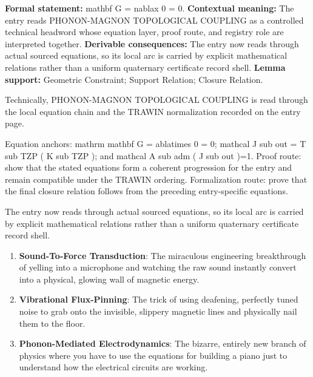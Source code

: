 \begingroup\footnotesize\setlength{\emergencystretch}{3em}\sloppy
\textbf{Formal statement:} mathbf G = nablax 0 = 0. \textbf{Contextual meaning:} The entry reads PHONON-MAGNON TOPOLOGICAL COUPLING as a controlled technical headword whose equation layer, proof route, and registry role are interpreted together. \textbf{Derivable consequences:} The entry now reads through actual sourced equations, so its local arc is carried by explicit mathematical relations rather than a uniform quaternary certificate record shell. \textbf{Lemma support:} Geometric Constraint; Support Relation; Closure Relation.\par
\endgroup

Technically, PHONON-MAGNON TOPOLOGICAL COUPLING is read through the local equation chain and the TRAWIN normalization recorded on the entry page.

Equation anchors: mathrm mathbf G = ablatimes 0 = 0; mathcal J sub out = T sub TZP ( K sub TZP ); and mathcal A sub adm ( J sub out )=1. Proof route: show that the stated equations form a coherent progression for the entry and remain compatible under the TRAWIN ordering. Formalization route: prove that the final closure relation follows from the preceding entry-specific equations.

The entry now reads through actual sourced equations, so its local arc is carried by explicit mathematical relations rather than a uniform quaternary certificate record shell.
\endgroup

\begin{enumerate}[leftmargin=1.6em,itemsep=6pt,topsep=4pt]
\item \textbf{Sound-To-Force Transduction}: The miraculous engineering breakthrough of yelling into a microphone and watching the raw sound instantly convert into a physical, glowing wall of magnetic energy.
\item \textbf{Vibrational Flux-Pinning}: The trick of using deafening, perfectly tuned noise to grab onto the invisible, slippery magnetic lines and physically nail them to the floor.
\item \textbf{Phonon-Mediated Electrodynamics}: The bizarre, entirely new branch of physics where you have to use the equations for building a piano just to understand how the electrical circuits are working.
\end{enumerate}

